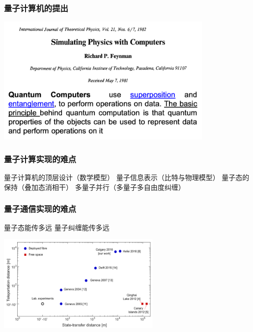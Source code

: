 \begin{frame} 
    \frametitle{量子计算机的提出}
    \begin{center}
        \includegraphics[width=0.8\textwidth]{figs/4.png}
    \end{center} 
\end{frame}

\begin{frame} 
    \frametitle{量子计算实现的难点}
    \begin{enumerate}
        \Item   量子计算机的顶层设计（数学模型）
        \Item   量子信息表示（比特与物理模型）
        \Item   量子态的保持（叠加态消相干）
        \Item   多量子并行（多量子多自由度纠缠）
    \end{enumerate}
\end{frame}

\begin{frame} 
    \frametitle{量子通信实现的难点}
    \begin{enumerate}
        \Item   量子态能传多远
        \Item   量子纠缠能传多远
    \end{enumerate}
    \begin{center}
        \includegraphics[width=0.6\textwidth]{figs/5.png}
    \end{center} 
\end{frame}

